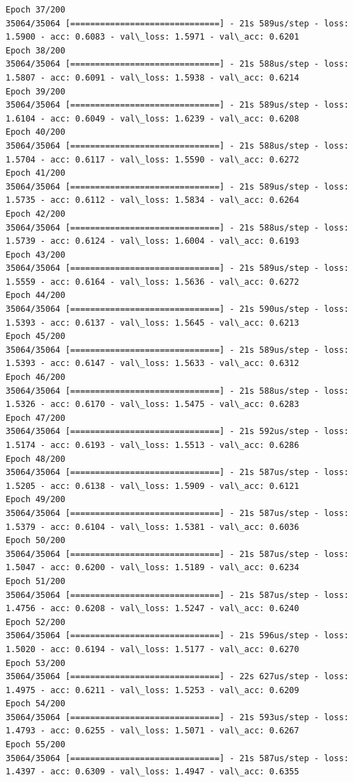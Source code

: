 \documentclass[11pt]{article}
\begin{document}
\begin{Verbatim}[commandchars=\\\{\}]
Epoch 37/200
35064/35064 [==============================] - 21s 589us/step - loss: 1.5900 - acc: 0.6083 - val\_loss: 1.5971 - val\_acc: 0.6201
Epoch 38/200
35064/35064 [==============================] - 21s 588us/step - loss: 1.5807 - acc: 0.6091 - val\_loss: 1.5938 - val\_acc: 0.6214
Epoch 39/200
35064/35064 [==============================] - 21s 589us/step - loss: 1.6104 - acc: 0.6049 - val\_loss: 1.6239 - val\_acc: 0.6208
Epoch 40/200
35064/35064 [==============================] - 21s 588us/step - loss: 1.5704 - acc: 0.6117 - val\_loss: 1.5590 - val\_acc: 0.6272
Epoch 41/200
35064/35064 [==============================] - 21s 589us/step - loss: 1.5735 - acc: 0.6112 - val\_loss: 1.5834 - val\_acc: 0.6264
Epoch 42/200
35064/35064 [==============================] - 21s 588us/step - loss: 1.5739 - acc: 0.6124 - val\_loss: 1.6004 - val\_acc: 0.6193
Epoch 43/200
35064/35064 [==============================] - 21s 589us/step - loss: 1.5559 - acc: 0.6164 - val\_loss: 1.5636 - val\_acc: 0.6272
Epoch 44/200
35064/35064 [==============================] - 21s 590us/step - loss: 1.5393 - acc: 0.6137 - val\_loss: 1.5645 - val\_acc: 0.6213
Epoch 45/200
35064/35064 [==============================] - 21s 589us/step - loss: 1.5393 - acc: 0.6147 - val\_loss: 1.5633 - val\_acc: 0.6312
Epoch 46/200
35064/35064 [==============================] - 21s 588us/step - loss: 1.5326 - acc: 0.6170 - val\_loss: 1.5475 - val\_acc: 0.6283
Epoch 47/200
35064/35064 [==============================] - 21s 592us/step - loss: 1.5174 - acc: 0.6193 - val\_loss: 1.5513 - val\_acc: 0.6286
Epoch 48/200
35064/35064 [==============================] - 21s 587us/step - loss: 1.5205 - acc: 0.6138 - val\_loss: 1.5909 - val\_acc: 0.6121
Epoch 49/200
35064/35064 [==============================] - 21s 587us/step - loss: 1.5379 - acc: 0.6104 - val\_loss: 1.5381 - val\_acc: 0.6036
Epoch 50/200
35064/35064 [==============================] - 21s 587us/step - loss: 1.5047 - acc: 0.6200 - val\_loss: 1.5189 - val\_acc: 0.6234
Epoch 51/200
35064/35064 [==============================] - 21s 587us/step - loss: 1.4756 - acc: 0.6208 - val\_loss: 1.5247 - val\_acc: 0.6240
Epoch 52/200
35064/35064 [==============================] - 21s 596us/step - loss: 1.5020 - acc: 0.6194 - val\_loss: 1.5177 - val\_acc: 0.6270
Epoch 53/200
35064/35064 [==============================] - 22s 627us/step - loss: 1.4975 - acc: 0.6211 - val\_loss: 1.5253 - val\_acc: 0.6209
Epoch 54/200
35064/35064 [==============================] - 21s 593us/step - loss: 1.4793 - acc: 0.6255 - val\_loss: 1.5071 - val\_acc: 0.6267
Epoch 55/200
35064/35064 [==============================] - 21s 587us/step - loss: 1.4397 - acc: 0.6309 - val\_loss: 1.4947 - val\_acc: 0.6355

\end{Verbatim}
\end{document}
